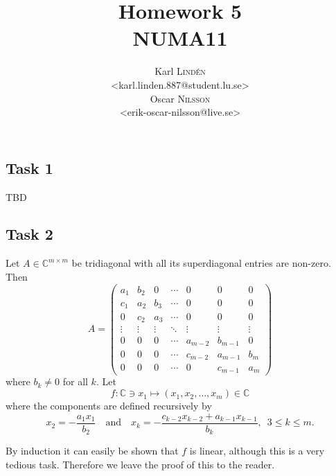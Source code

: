 \documentclass[a4paper,12pt]{article}
\begin{document}
\title{Homework 5 \\ NUMA11}
\author{
  Karl \textsc{Lind\'{e}n} \\
  <karl.linden.887@student.lu.se> \\
  Oscar \textsc{Nilsson} \\
  <erik-oscar-nilsson@live.se>
}

\maketitle
\thispagestyle{empty}

\newpage


\subsection*{Task 1}

TBD


\subsection*{Task 2}

Let \(A \in \mathbb{C}^{m \times m}\) be tridiagonal with all its superdiagonal
entries are non-zero.
Then
\[
  A =
    \begin{pmatrix}
      a_1    & b_2    & 0      & \cdots & 0       & 0       & 0      \\
      c_1    & a_2    & b_3    & \cdots & 0       & 0       & 0      \\
      0      & c_2    & a_3    & \cdots & 0       & 0       & 0      \\
      \vdots & \vdots & \vdots & \ddots & \vdots  & \vdots  & \vdots \\
      0      & 0      & 0      & \cdots & a_{m-2} & b_{m-1} & 0      \\
      0      & 0      & 0      & \cdots & c_{m-2} & a_{m-1} & b_m    \\
      0      & 0      & 0      & \cdots & 0       & c_{m-1} & a_m
    \end{pmatrix}
\]
where \(b_k \ne 0\) for all \(k\).
Let
\[ f: \mathbb{C} \ni x_1 \mapsto (x_1,x_2,\dots,x_m) \in \mathbb{C} \]
where the components are defined recursively by
\[
  x_2 = - \frac{a_1 x_1}{b_2}
  \quad \text{and} \quad
  x_k = - \frac{c_{k-2}x_{k-2} + a_{k-1}x_{k-1}}{b_k}, \enspace 3 \le k \le m.
\]

By induction it can easily be shown that \(f\) is linear, although this is a
very tedious task.
Therefore we leave the proof of this to the reader.
\end{document}
